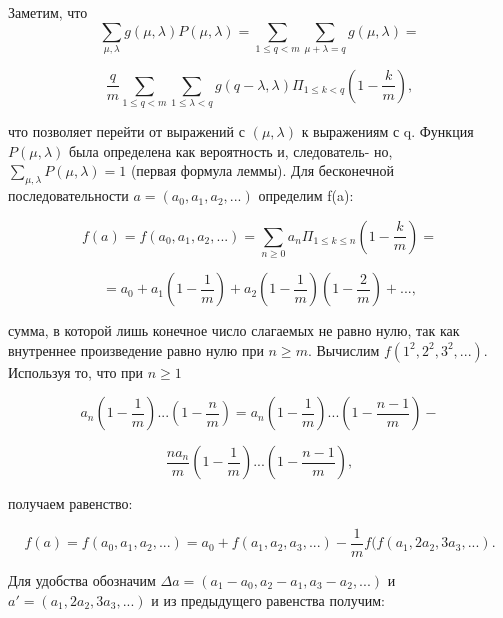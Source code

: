 \begin{myproof}
\indent Заметим, что \linebreak 
$$\sum_{\mu,\lambda} g(\mu, \lambda) P(\mu, \lambda) = \sum_{1 \leqslant q < m} \sum_{\mu + \lambda = q} g(\mu, \lambda) =$$ \par 
$$\frac{q}{m} \sum_{1 \leqslant q < m} \sum_{1 \leqslant \lambda < q} g(q - \lambda,\lambda) \Pi_{1 \leqslant k < q} (1 - \frac{k}{m}),$$ \par 

что позволяет перейти от выражений с $(\mu, \lambda)$ к выражениям с q. \linebreak \indent Функция $P(\mu, \lambda)$ была определена как вероятность и, следователь- \linebreak \indent но, $\sum_{\mu,\lambda} P(\mu,\lambda) = 1$ (первая формула леммы). \linebreak \indent
Для бесконечной последовательности $a = (a_{0}, a_{1}, a_{2},...)$ 
 определим \linebreak \indent f(a): \par 
 $$f(a) = f(a_{0}, a_{1}, a_{2},...) = \sum_{n \geqslant 0} a_{n} \Pi_{1 \leqslant k \leqslant n} (1 - \frac{k}{m}) = $$ \par
 
 $$= a_{0} + a_{1}(1 - \frac{1}{m}) + a_{2}(1 - \frac{1}{m})(1 - \frac{2}{m}) + ...,$$ \par 
 сумма, в которой лишь конечное число слагаемых не равно нулю, \linebreak \indent так как внутреннее произведение равно нулю при $n \geqslant m$. Вычислим \linebreak \indent $f(1^{2}, 2^{2}, 3^{2},...)$. Используя то, что при $n \geqslant 1$ \linebreak \indent \newpage
 
 
 $$a_{n}(1 - \frac{1}{m})...(1 - \frac{n}{m}) = a_{n}(1 - \frac{1}{m})...(1 - \frac{n - 1}{m}) -$$ \par
 $$\frac{na_{n}}{m}(1 - \frac{1}{m})...(1 - \frac{n - 1}{m}),$$ \par 
\noindent получаем равенство: \par 
 
 $$f(a) = f( a_{0}, a_{1}, a_{2},...) = a_{0} +  f( a_{1}, a_{2}, a_{3},...) - \frac{1}{m} f( f( a_{1}, 2a_{2}, 3a_{3},...).$$ \par 
 
\noindent Для удобства обозначим $\Delta a = (a_{1} - a_{0}, a_{2} - a_{1}, a_{3} - a_{2},...)$ и $a' = (a_{1}, 2a_{2}, 3a_{3},...)$ и из предыдущего равенства получим: \par 
 

\end{myproof}
